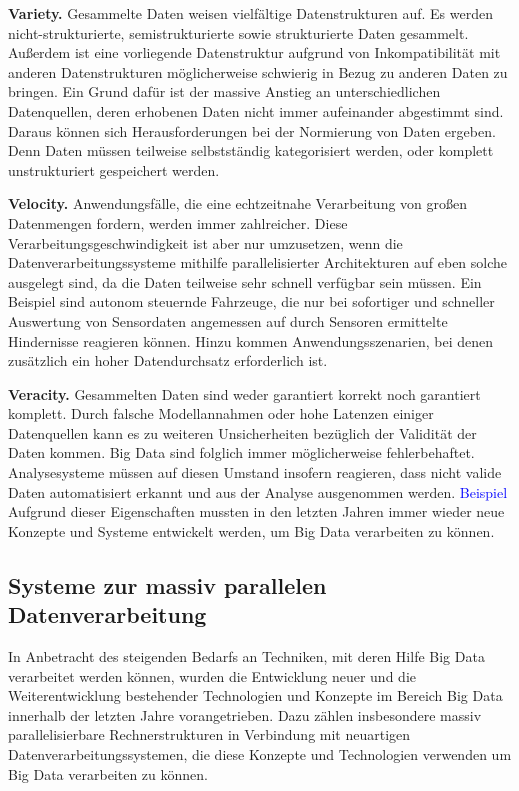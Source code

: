 \textbf{Variety.} Gesammelte Daten weisen vielfältige Datenstrukturen auf. Es werden nicht-strukturierte, semistrukturierte sowie strukturierte Daten gesammelt. Außerdem ist eine vorliegende Datenstruktur aufgrund von Inkompatibilität mit anderen Datenstrukturen möglicherweise schwierig in Bezug zu anderen Daten zu bringen. Ein Grund dafür ist der massive Anstieg an unterschiedlichen Datenquellen, deren erhobenen Daten nicht immer aufeinander abgestimmt sind. Daraus können sich Herausforderungen bei der Normierung von Daten ergeben. Denn Daten müssen teilweise selbstständig kategorisiert werden, oder komplett unstrukturiert gespeichert werden.

\textbf{Velocity.} Anwendungsfälle, die eine echtzeitnahe Verarbeitung von großen Datenmengen fordern, werden immer zahlreicher. Diese Verarbeitungsgeschwindigkeit ist aber nur umzusetzen, wenn die Datenverarbeitungssysteme mithilfe parallelisierter Architekturen auf eben solche ausgelegt sind, da die Daten teilweise sehr schnell verfügbar sein müssen. Ein Beispiel sind autonom steuernde Fahrzeuge, die nur bei sofortiger und schneller Auswertung von Sensordaten angemessen auf durch Sensoren ermittelte Hindernisse reagieren können. Hinzu kommen Anwendungsszenarien, bei denen zusätzlich ein hoher Datendurchsatz erforderlich ist. 

\textbf{Veracity.} Gesammelten Daten sind weder garantiert korrekt noch garantiert komplett. Durch falsche Modellannahmen oder hohe Latenzen einiger Datenquellen kann es zu weiteren Unsicherheiten bezüglich der Validität der Daten kommen. Big Data sind folglich immer möglicherweise fehlerbehaftet. Analysesysteme müssen auf diesen Umstand insofern reagieren, dass nicht valide Daten automatisiert erkannt und aus der Analyse ausgenommen werden. \textcolor{blue}{Beispiel}
Aufgrund dieser Eigenschaften mussten in den letzten Jahren immer wieder neue Konzepte und Systeme entwickelt werden, um Big Data verarbeiten zu können. 

\subsection{Systeme zur massiv parallelen Datenverarbeitung}
\label{sec:GrosseDatenmengen}
In Anbetracht des steigenden Bedarfs an Techniken, mit deren Hilfe Big Data verarbeitet werden können, wurden die Entwicklung neuer und die Weiterentwicklung bestehender Technologien und Konzepte im Bereich Big Data innerhalb der letzten Jahre vorangetrieben. Dazu zählen insbesondere massiv parallelisierbare Rechnerstrukturen in Verbindung mit neuartigen Datenverarbeitungssystemen, die diese Konzepte und Technologien verwenden um Big Data verarbeiten zu können. 

